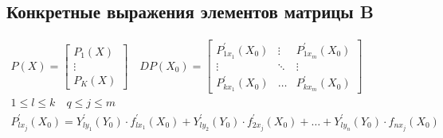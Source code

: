 \documentclass[main]{subfiles}
\begin{document}
    \subsection*{Конкретные выражения элементов матрицы B} 
    \begin{gather*}
        P(X) = \begin{bmatrix*}
            P_1(X) \\
            \vdots \\
            P_K(X) 
        \end{bmatrix*} \quad DP(X_0) = \begin{bmatrix*}
            P_{1x_1}^\prime(X_0) & \vdots & P_{1x_m}^\prime(X_0) \\
            \vdots & \ddots & \vdots \\
            P_{kx_1}^\prime(X_0) & \ldots & P_{kx_m}^\prime(X_0)
        \end{bmatrix*} \\
        1 \leq l \leq k \quad q \leq j \leq m \\
        P^\prime_{lx_j}(X_0) = Y^\prime_{ly_1}(Y_0) \cdot f^\prime_{lx_1}(X_0) + Y^\prime_{ly_2}(Y_0) \cdot f^\prime_{2x_j}(X_0) + \ldots +
        Y^\prime_{ly_n} (Y_0) \cdot f_{nx_j}(X_0)
    \end{gather*}
\end{document}
